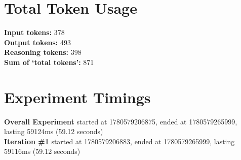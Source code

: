 \documentclass{article}
\begin{document}
\section*{Total Token Usage}
\textbf{Input tokens: }378
\\\textbf{Output tokens: }493
\\\textbf{Reasoning tokens: }398
\\\textbf{Sum of `total tokens': }871
\section*{Experiment Timings}
\textbf{Overall Experiment} started at 1780579206875, ended at 1780579265999, lasting 59124ms (59.12 seconds)
\\\textbf{Iteration \#1} started at 1780579206883, ended at 1780579265999, lasting 59116ms (59.12 seconds)
\end{document}
